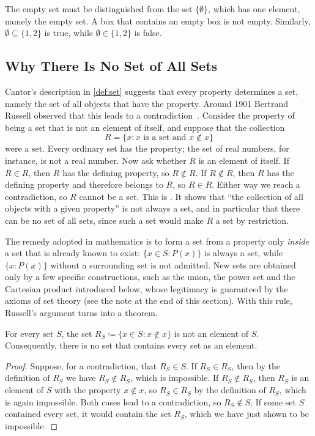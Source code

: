 The empty set must be distinguished from the set $\{\emptyset\}$, which has one element, namely the empty set. A box that contains an empty box is not empty. Similarly, $\emptyset\subseteq\{1,2\}$ is true, while $\emptyset\in\{1,2\}$ is false.

\subsection{Why There Is No Set of All Sets}

Cantor's description in \cref{def:set} suggests that every property determines a set, namely the set of all objects that have the property. Around 1901 Bertrand Russell observed that this leads to a contradiction~\cite{russell1903,vanheijenoort1967}. Consider the property of being a set that is not an element of itself, and suppose that the collection
\[
R=\{x: x\text{ is a set and }x\notin x\}
\]
were a set. Every ordinary set has the property; the set of real numbers, for instance, is not a real number. Now ask whether $R$ is an element of itself. If $R\in R$, then $R$ has the defining property, so $R\notin R$. If $R\notin R$, then $R$ has the defining property and therefore belongs to $R$, so $R\in R$. Either way we reach a contradiction, so $R$ cannot be a set. This is . It shows that ``the collection of all objects with a given property'' is not always a set, and in particular that there can be no set of all sets, since such a set would make $R$ a set by restriction.

The remedy adopted in mathematics is to form a set from a property only \emph{inside} a set that is already known to exist: $\{x\in S: P(x)\}$ is always a set, while $\{x: P(x)\}$ without a surrounding set is not admitted. New sets are obtained only by a few specific constructions, such as the union, the power set and the Cartesian product introduced below, whose legitimacy is guaranteed by the axioms of set theory (see the note at the end of this section). With this rule, Russell's argument turns into a theorem.

\begin{proposition}
\label{prop:russell}
For every set $S$, the set $R_S\coloneqq\{x\in S: x\notin x\}$ is not an element of $S$. Consequently, there is no set that contains every set as an element.
\end{proposition}

\begin{proof}
Suppose, for a contradiction, that $R_S\in S$. If $R_S\in R_S$, then by the definition of $R_S$ we have $R_S\notin R_S$, which is impossible. If $R_S\notin R_S$, then $R_S$ is an element of $S$ with the property $x\notin x$, so $R_S\in R_S$ by the definition of $R_S$, which is again impossible. Both cases lead to a contradiction, so $R_S\notin S$. If some set $S$ contained every set, it would contain the set $R_S$, which we have just shown to be impossible.
\end{proof}

